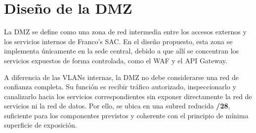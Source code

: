 \documentclass[11pt, a4paper, oneside]{report}
\begin{document}
\section{Diseño de la DMZ}

La DMZ se define como una zona de red intermedia entre los accesos externos y los servicios internos de Franco's SAC. En el diseño propuesto, esta zona se implementa únicamente en la sede central, debido a que allí se concentran los servicios expuestos de forma controlada, como el WAF y el API Gateway.

A diferencia de las VLANs internas, la DMZ no debe considerarse una red de confianza completa. Su función es recibir tráfico autorizado, inspeccionarlo y canalizarlo hacia los servicios correspondientes sin exponer directamente la red de servicios ni la red de datos. Por ello, se ubica en una subred reducida \textbf{/28}, suficiente para los componentes previstos y coherente con el principio de mínima superficie de exposición.

\renewcommand{\arraystretch}{1.3}
\footnotesize
{}
\end{document}
